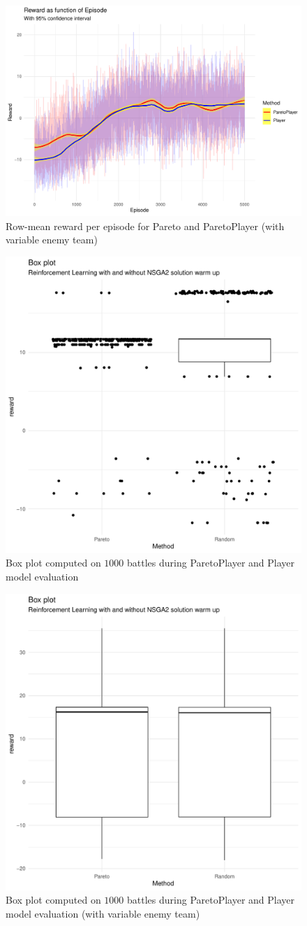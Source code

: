 \documentclass[journal]{IEEEtran}
\begin{document}
\begin{figure}[H]
    \centering
    \includegraphics[width=0.8\linewidth]{images/rewardasfunctionofepisode2.pdf}
    \caption{Row-mean reward per episode for Pareto and ParetoPlayer (with variable enemy team)}
    \label{fig:reward_per_episode_var_team}
\end{figure}

\begin{figure}[H]
    \centering
    \includegraphics[width=0.6\linewidth]{images/box_plot_2v2.pdf}
    \caption{Box plot computed on $1000$ battles during ParetoPlayer and Player model evaluation}
    \label{fig:box_plot_2v2}
\end{figure}

\begin{figure}[H]
    \centering
    \includegraphics[width=0.6\linewidth]{images/box_plot_2v2_sampled.pdf}
    \caption{Box plot computed on $1000$ battles during ParetoPlayer and Player model evaluation (with variable enemy team)}
    \label{fig:box_plot_2v2_sampled}
\end{figure}
\end{document}
